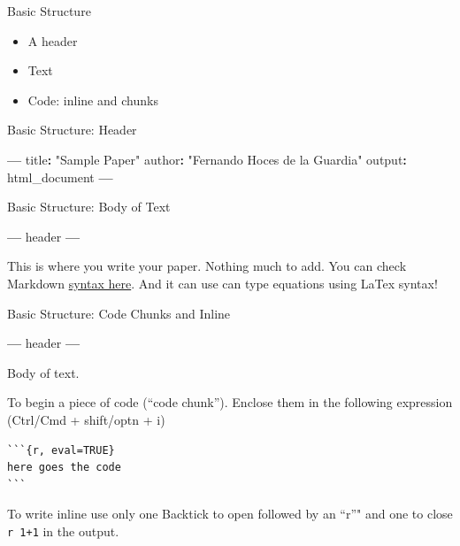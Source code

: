 \documentclass[ignorenonframetext,]{beamer}
\newenvironment{Shaded}{\begin{snugshade}}{\end{snugshade}}
\newcommand{\StringTok}[1]{\textcolor[rgb]{0.31,0.60,0.02}{#1}}
\newcommand{\OperatorTok}[1]{\textcolor[rgb]{0.81,0.36,0.00}{\textbf{#1}}}
\newcommand{\NormalTok}[1]{#1}
\providecommand{\tightlist}{%
  \setlength{\itemsep}{0pt}\setlength{\parskip}{0pt}}
\begin{document}
\begin{frame}{Basic Structure}

\begin{itemize}
\tightlist
\item
  A header
\item
  Text
\item
  Code: inline and chunks
\end{itemize}

\end{frame}

\begin{frame}[fragile]{Basic Structure: Header}

\begin{Shaded}
\begin{Highlighting}[]
\OperatorTok{---}
\NormalTok{title}\OperatorTok{:}\StringTok{ "Sample Paper"}
\NormalTok{author}\OperatorTok{:}\StringTok{ "Fernando Hoces de la Guardia"}
\NormalTok{output}\OperatorTok{:}\StringTok{ }\NormalTok{html_document}
\OperatorTok{---}
\end{Highlighting}
\end{Shaded}

\end{frame}

\begin{frame}[fragile]{Basic Structure: Body of Text}

\begin{Shaded}
\begin{Highlighting}[]
\OperatorTok{---}
\NormalTok{header}
\OperatorTok{---}
\end{Highlighting}
\end{Shaded}

This is where you write your paper. Nothing much to add. You can check
Markdown
\href{https://www.rstudio.com/wp-content/uploads/2015/02/rmarkdown-cheatsheet.pdf}{syntax
here}. And it can use can type equations using LaTex syntax!

\end{frame}

\begin{frame}[fragile]{Basic Structure: Code Chunks and Inline}

\begin{Shaded}
\begin{Highlighting}[]
\OperatorTok{---}
\NormalTok{header}
\OperatorTok{---}
\end{Highlighting}
\end{Shaded}

Body of text.

To begin a piece of code (``code chunk''). Enclose them in the following
expression (Ctrl/Cmd + shift/optn + i)

\begin{verbatim}
```{r, eval=TRUE}
here goes the code
```
\end{verbatim}

To write inline use only one Backtick to open followed by an ``r''" and
one to close \texttt{\textasciigrave{}r\ 1+1\textasciigrave{}} in the
output.

\end{frame}
\end{document}
